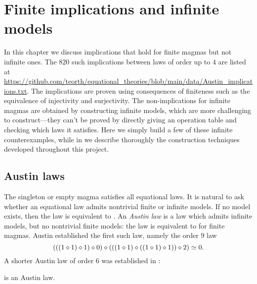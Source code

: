 \chapter{Finite implications and infinite models}\label{infinite-model-chapter}

In this chapter we discuss implications that hold for finite magmas but not infinite ones.  The $820$ such implications between laws of order up to $4$ are listed at \url{https://github.com/teorth/equational_theories/blob/main/data/Austin_implications.txt}.  The implications are proven using consequences of finiteness such as the equivalence of injectivity and surjectivity.  The non-implications for infinite magmas are obtained by constructing infinite models, which are more challenging to construct---they can't be proved by directly giving an operation table and checking which laws it satisfies.  Here we simply build a few of these infinite counterexamples, while in  we describe thoroughly the construction techniques developed throughout this project.

\section{Austin laws}

The singleton or empty magma satisfies all equational laws.  It is natural to ask whether an equational law admits nontrivial finite or infinite models.
If no model exists, then the law is equivalent to .  An \emph{Austin law} is a law which admits infinite models, but no nontrivial finite models: the law is equivalent to  for finite magmas.
Austin \cite{austin} established the first such law, namely the order $9$ law
$$ (((1 \diamond 1) \diamond 1) \diamond 0) \diamond (((1 \diamond 1) \diamond ((1 \diamond 1) \diamond 1)) \diamond 2) \simeq 0.$$
A shorter Austin law of order $6$ was established in \cite{Kisielewicz}:

\begin{theorem}
  \leanok
  \label{kis-thm}
   is an Austin law.
\end{theorem}

